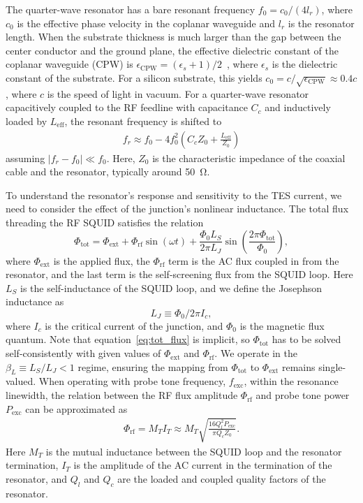 \documentclass[
 prd,
 reprint,
 superscriptaddress,
 amsmath,amssymb,
 aps,
 floatfix,
]{revtex4-2}
\begin{document}
The quarter-wave resonator has a bare resonant frequency $f_0 = c_0 / (4 l_r)$, where $c_0$ is the effective phase velocity in the coplanar waveguide and $l_r$ is the resonator length. When the substrate thickness is much larger than the gap between the center conductor and the ground plane, the effective dielectric constant of the coplanar waveguide (CPW) is $\epsilon_{\mathrm{CPW}} = (\epsilon_s + 1)/2$~\cite{steer_microwave_2019}, where $\epsilon_s$ is the dielectric constant of the substrate. For a silicon substrate, this yields $c_0 = c / \sqrt{\epsilon_{\mathrm{CPW}}} \approx 0.4c$, where $c$ is the speed of light in vacuum. For a quarter-wave resonator capacitively coupled to the RF feedline with capacitance $C_c$ and inductively loaded by $L_{\text{eff}}$, the resonant frequency is shifted to~\cite{kempf_design_2017}
\begin{gather} \label{eq:f_res_vs_L_T}
    f_r \approx f_0 - 4 f_0^2 \left( C_c Z_0 + \frac{L_{\text{eff}}}{Z_0} \right)
\end{gather}
assuming $|f_r - f_0| \ll f_0$. Here, $Z_0$ is the characteristic impedance of the coaxial cable and the resonator, typically around \qty{50}{\ohm}.

To understand the resonator's response and sensitivity to the TES current, we need to consider the effect of the junction's nonlinear inductance. The total flux threading the RF SQUID satisfies the relation~\cite{wegner_analytical_2022}
\begin{equation} \label{eq:tot_flux}
\Phi_{\mathrm{tot}} = \Phi_{\mathrm{ext}} + \Phi_{\mathrm{rf}} \sin(\omega t) + \frac{\Phi_0 L_S}{2\pi L_J} \sin\left( \frac{2\pi \Phi_{\mathrm{tot}}}{\Phi_0} \right),
\end{equation}
where $\Phi_{\mathrm{ext}}$ is the applied flux, the $\Phi_{\mathrm{rf}}$ term is the AC flux coupled in from the resonator, and the last term is the self-screening flux from the SQUID loop. Here $L_S$ is the self-inductance of the SQUID loop, and we define the Josephson inductance as
\begin{equation} \label{eq:L_J_def}
    L_J\equiv\Phi_0/2\pi I_c,
\end{equation}
where $I_c$ is the critical current of the junction, and $\Phi_0$ is the magnetic flux quantum. Note that equation~\eqref{eq:tot_flux} is implicit, so $\Phi_{\text{tot}}$ has to be solved self-consistently with given values of $\Phi_{\text{ext}}$ and $\Phi_{\text{rf}}$. We operate in the $\beta_L\equiv L_S/L_J<1$ regime, ensuring the mapping from $\Phi_{\text{tot}}$ to $\Phi_{\text{ext}}$ remains single-valued. When operating with probe tone frequency, $f_{\text{exc}}$, within the resonance linewidth, the relation between the RF flux amplitude $\Phi_{\text{rf}}$ and probe tone power $P_{\text{exc}}$ can be approximated as~\cite{wegner_analytical_2022}
\begin{gather} \label{eq:Phi_rf}
    \Phi_{\text{rf}} = M_T I_T \approx M_T \sqrt{\frac{16 Q_l^2 P_{\text{exc}}}{\pi Q_c Z_0}}.
\end{gather}
Here $M_T$ is the mutual inductance between the SQUID loop and the resonator termination, $I_T$ is the amplitude of the AC current in the termination of the resonator, and $Q_l$ and $Q_c$ are the loaded and coupled quality factors of the resonator.
\end{document}
